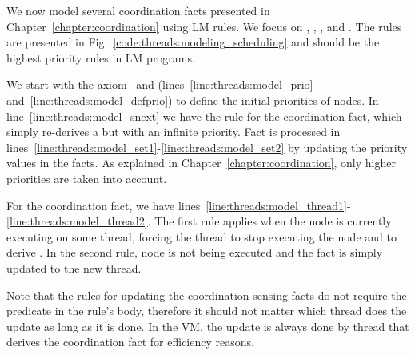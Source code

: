 We now model several coordination facts presented in
Chapter~\ref{chapter:coordination} using LM rules. We focus on
, , , and
. The rules are presented in
Fig.~\ref{code:threads:modeling_scheduling} and should be the highest priority
rules in LM programs.

We start with the axiom~ and
(lines~\ref{line:threads:model_prio} and~\ref{line:threads:model_defprio}) to
define the initial priorities of nodes. In line~\ref{line:threads:model_snext}
we have the rule for the  coordination fact, which simply
re-derives a  but with an infinite priority. Fact
 is processed in
lines~\ref{line:threads:model_set1}-\ref{line:threads:model_set2} by updating
the priority values in the  facts. As explained in
Chapter~\ref{chapter:coordination}, only higher priorities are taken into
account.

For the  coordination fact, we have
lines~\ref{line:threads:model_thread1}-\ref{line:threads:model_thread2}. The
first rule applies when the node is currently executing on some thread, forcing
the thread to stop executing the node and to derive . In the
second rule, node  is not being executed and the  fact is
simply updated to the new thread.

Note that the rules for updating the coordination sensing facts do not require
the  predicate in the rule's body, therefore it should not matter
which thread does the update as long as it is done. In the VM, the update is
always done by thread that derives the coordination fact for efficiency reasons.

